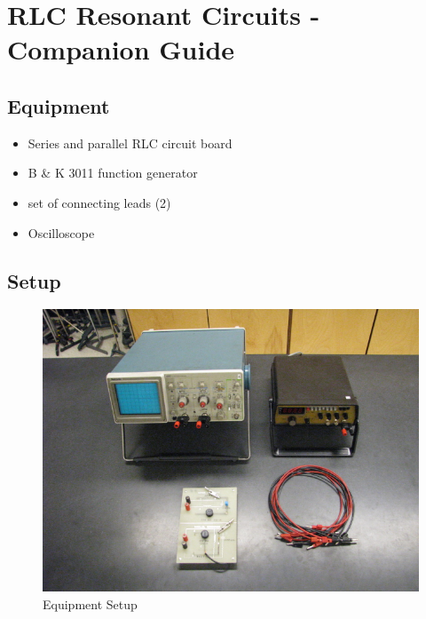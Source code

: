 \documentclass[justified]{tufte-book}
\begin{document}
\chapter{RLC Resonant Circuits - Companion Guide}


\section{Equipment}
\begin{minipage}[t]{0.6\textwidth}
\begin{itemize}[noitemsep]
\item Series and parallel RLC circuit board
\item B \& K 3011 function generator
\item set of connecting leads (2)
\end{itemize}
\end{minipage}
\begin{minipage}[t]{0.35\textwidth}
\begin{itemize}[noitemsep]
\item Oscilloscope
\end{itemize}
\end{minipage}


\section{Setup}
\begin{figure}
\includegraphics{RLC-Resonant-Circuits-Setup.jpg}
\caption{Equipment Setup}
\label{pic:RLCsetup}
\end{figure}
\end{document}
